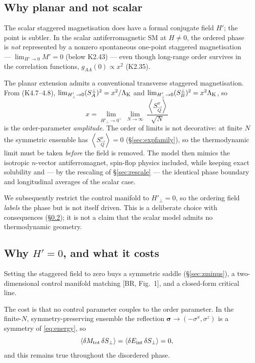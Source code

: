 \documentclass[11pt,a4paper]{article}
\newcommand{\bQ}{\vec Q}
\newcommand{\avg}[1]{\left\langle #1 \right\rangle}
\newcommand{\LK}{\Lambda_{\rm K}}
\newcommand{\bQ}{\vec Q}
\newcommand{\avg}[1]{\left\langle #1 \right\rangle}
\begin{document}
\subsection{Why planar and not scalar}
The scalar staggered magnetisation does have a formal conjugate field $H'$; the point is
subtler. In the scalar antiferromagnetic SM at $H\neq0$, the ordered phase is \emph{not}
represented by a nonzero spontaneous one-point staggered magnetisation ---
$\lim_{H'\to0}M'=0$ (below K2.43) --- even though long-range order survives in the
correlation functions, $g_{AA}(0)\propto x^2$ (K2.35).

The planar extension admits a conventional transverse staggered magnetisation. From
(K4.7--4.8), $\lim_{H'_\perp\to0}(S^\perp_A)^2=x^2/\LK$ and
$\lim_{H'_\perp\to0}(S^\perp_B)^2=x^2\LK$, so
\begin{equation}
  \boxed{\ x=\lim_{H'_\perp\to0^+}\ \lim_{N\to\infty}\ \frac{\avg{S^x_{\bQ}}}{\sqrt N}\ }
  \label{eq:xdef}
\end{equation}
is the order-parameter \emph{amplitude}. The order of limits is not decorative: at finite
$N$ the symmetric ensemble has $\avg{S^x_{\bQ}}=0$ (\S\ref{sec:expfamily}), so the
thermodynamic limit must be taken \emph{before} the field is removed. %
The model then mimics the isotropic $n$-vector antiferromagnet,
spin-flop physics included, while keeping exact solubility and --- by the rescaling of
\S\ref{sec:rescale} --- the identical phase boundary and longitudinal averages of the scalar
case.

We subsequently restrict the control manifold to $H'_\perp=0$, so the ordering field
\emph{labels} the phase but is not itself driven. This is a deliberate choice with
consequences (\S\ref{sec:cost}); it is not a claim that the scalar model admits no
thermodynamic geometry.

\subsection{Why $H'=0$, and what it costs}
\label{sec:cost}
Setting the staggered field to zero buys a symmetric saddle (\S\ref{sec:zminus}), a
two-dimensional control manifold matching [BR, Fig.~1], and a closed-form critical line.

The cost is that no control parameter couples to the order parameter. In the finite-$N$,
symmetry-preserving ensemble the reflection $\bm\sigma\to(-\sigma^x,\sigma^z)$ is a symmetry
of \eqref{eq:energy}, so
\begin{equation}
  \avg{\delta M_{\rm tot}\,\delta S_\perp}=\avg{\delta E_{\rm int}\,\delta S_\perp}=0 ,
  \label{eq:decoupling}
\end{equation}
and this remains true throughout the disordered phase.
\end{document}
